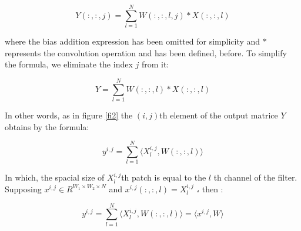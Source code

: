 \documentclass{report}
\begin{document}
\begin{equation*}
Y(:,:,j) = \sum^N_{l=1} W(:,:,l,j) \ast X(:,:,l)
\end{equation*} 

where the bias addition expression has been omitted for simplicity and $ * $
represents the convolution operation and has been defined, before. To simplify the formula, we eliminate the index 
$ j $
from it:

\begin{equation*}
Y = \sum^N_{l=1} W(:,:,l) \ast X(:,:,l)
\end{equation*} 

In other words, as in figure
\ref{fi2}
 the 
$ (i,j) $th element of the output matrice $ Y $
obtains by the formula:

\begin{equation} \label{eq:v}
y^{i,j} = \sum^N_{l=1}\big\langle X^{i,j}_{l},W(:,:,l)\big\rangle
\end{equation} 

In which, the spacial size of
$ X^{i,j}_{l} $th patch is equal to the $ l $ th channel of the filter.
Supposing 
$x^{i,j}\in R^{W_{1}\times W_{2}\times N}$
and
$ x^{i,j}(:,:,l)= X^{i,j}_{l} $
،
then :

\begin{equation} \label{eq:544}
y^{i,j} = \sum^N_{l=1}\big\langle X^{i,j}_{l},W(:,:,l)\big\rangle = \big\langle x^{i,j},W\big\rangle
\end{equation} 
\end{document}
